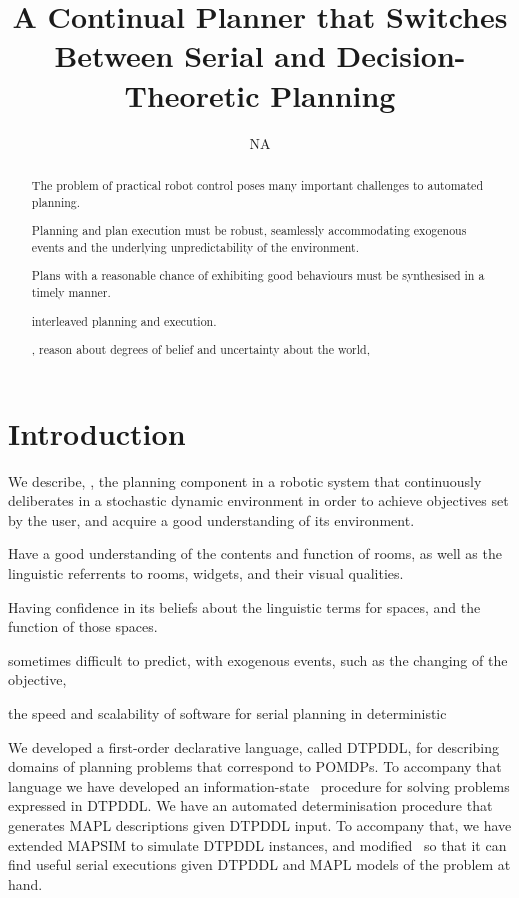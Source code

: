 \documentclass[letterpaper]{article}
\title{A Continual Planner that Switches Between Serial and
  Decision-Theoretic Planning}
\author{NA}
\begin{document}
 
\maketitle

\begin{abstract}

The problem of practical robot control poses many important challenges
to automated planning. 

Planning and plan execution must be robust, seamlessly accommodating
exogenous events and the underlying unpredictability of the
environment. 

Plans with a reasonable chance of exhibiting good behaviours must be
synthesised in a timely manner.

interleaved planning and execution. 

, reason about degrees of belief and uncertainty about the world, 

\end{abstract}

\section{Introduction}

We describe, \pcogx, the planning component in a robotic system that
continuously deliberates in a stochastic dynamic environment in order
to achieve objectives set by the user, and acquire a good
understanding of its environment.

Have a good understanding of the contents and function of rooms, as
well as the linguistic referrents to rooms, widgets, and their visual
qualities.

Having confidence in its beliefs about the linguistic terms for
spaces, and the function of those spaces.



sometimes difficult to predict, with exogenous events, such as the
changing of the objective, 





the speed and scalability of software for serial planning in
deterministic




We developed a first-order declarative language, called DTPDDL, for
describing domains of planning problems that correspond to POMDPs.  To
accompany that language we have developed an information-state
\laostar\ procedure for solving problems expressed in DTPDDL. We have
an automated determinisation procedure that generates MAPL
descriptions given DTPDDL input. To accompany that, we have extended
MAPSIM to simulate DTPDDL instances, and modified \fastdownward\ so
that it can find useful serial executions given DTPDDL and MAPL models
of the problem at hand. 
\end{document}
